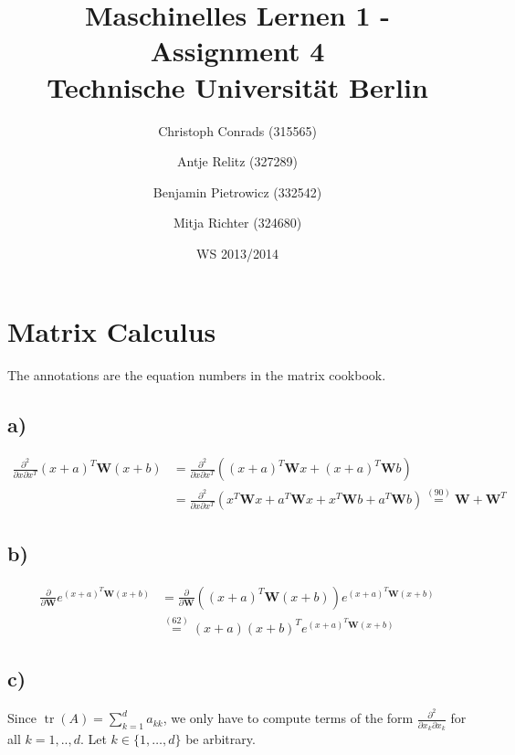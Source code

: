 \documentclass[paper=a4,fontsize=10pt,DIV11,BCOR10mm]{scrartcl}
\DeclareMathOperator{\tr}{tr}
\begin{document}
\title{Maschinelles Lernen 1 - Assignment 4\\
\small{Technische Universität Berlin}}


\author{\small{Christoph Conrads (315565)}\and \small{Antje Relitz (327289)}  \and \small{Benjamin Pietrowicz (332542)} \and \small{Mitja Richter (324680)} }

\date{WS 2013/2014}

\maketitle


\section{Matrix Calculus}
The annotations are the equation numbers in the matrix cookbook.

\subsection*{a)}
\begin{align*}
\frac{\partial^2}{\partial x \partial x^T}(x+a)^T \mathbf{W}(x+b) &= \frac{\partial^2}{\partial x \partial x^T} ((x+a)^T \mathbf{W}x + (x+a)^T \mathbf{W}b)\\
&= \frac{\partial^2}{\partial x \partial x^T} (x^T\mathbf{W}x + a^T\mathbf{W}x + x^T\mathbf{W}b + a^T\mathbf{W}b) \stackrel{(90)}{=} \mathbf{W} + \mathbf{W}^T 
\end{align*}

\subsection*{b)}

\begin{align*}
 \frac{\partial}{\partial\mathbf{W}}e^{(x+a)^T\mathbf{W}(x+b)} &= \frac{\partial}{\partial\mathbf{W}}((x+a)^T\mathbf{W}(x+b)) e^{(x+a)^T\mathbf{W}(x+b)} \\
 &\stackrel{(62)}{=} (x+a)(x+b)^Te^{(x+a)^T\mathbf{W}(x+b)}
\end{align*}

\subsection*{c)}

Since $\tr(A)=\sum_{k=1}^d a_{kk}$, we only have to compute terms of the form $\frac{\partial^2}{\partial x_k\partial x_k}$ for all $k=1,..,d$. Let $k\in\{1,\dots,d\}$ be arbitrary.
\end{document}
